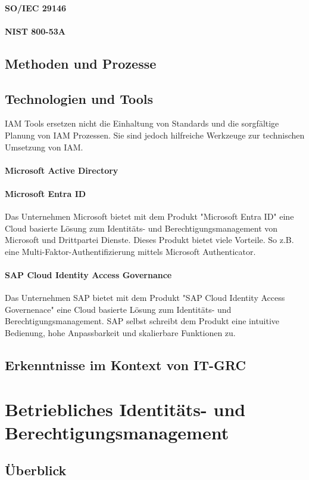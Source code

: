 \documentclass[10pt]{article}
\begin{document}
\paragraph{SO/IEC 29146}
\paragraph{NIST 800-53A}
\subsection{Methoden und Prozesse}
\subsection{Technologien und Tools}
IAM Tools ersetzen nicht die Einhaltung von Standards und die sorgfältige Planung von IAM Prozessen. Sie sind jedoch hilfreiche Werkzeuge zur technischen Umsetzung von IAM.
\paragraph{Microsoft Active Directory}
\paragraph{Microsoft Entra ID}
Das Unternehmen Microsoft bietet mit dem Produkt "Microsoft Entra ID" eine Cloud basierte Lösung zum Identitäts- und Berechtigungsmanagement von Microsoft und Drittpartei Dienste. Dieses Produkt bietet viele Vorteile. So z.B. eine Multi-Faktor-Authentifizierung mittels Microsoft Authenticator.
\paragraph{SAP Cloud Identity Access Governance}
Das Unternehmen SAP bietet mit dem Produkt "SAP Cloud Identity Access Governenace" eine Cloud basierte Lösung zum Identitäts- und Berechtigungsmanagement. SAP selbst schreibt dem Produkt eine intuitive Bedienung, hohe Anpassbarkeit und skalierbare Funktionen zu.
\subsection{Erkenntnisse im Kontext von IT-GRC}
\section{Betriebliches Identitäts- und Berechtigungsmanagement}
\label{sec:betrieb}
\subsection{Überblick}
\end{document}
